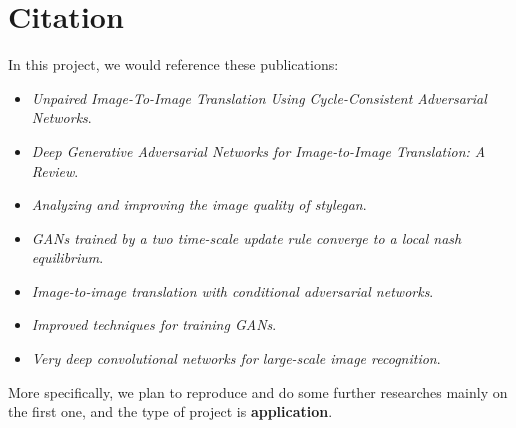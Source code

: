 \section{Citation}

In this project, we would reference these publications:
\begin{itemize}
    \item \textit{Unpaired Image-To-Image Translation Using Cycle-Consistent Adversarial Networks}\cite{zhu_unpaired_2017}.
    \item \textit{Deep Generative Adversarial Networks for Image-to-Image Translation: A Review}\cite{sym12101705}.
    \item \textit{Analyzing and improving the image quality of stylegan}\cite{karras2020analyzing}.
    \item \textit{GANs trained by a two time-scale update rule converge to a local nash equilibrium}\cite{heusel2017gans}.
    \item \textit{Image-to-image translation with conditional adversarial networks}\cite{isola2017image}.
    \item \textit{Improved techniques for training GANs}\cite{salimans2016improved}.
    \item \textit{Very deep convolutional networks for large-scale image recognition}\cite{simonyan2014very}.
\end{itemize}

More specifically, we plan to reproduce and
do some further researches mainly on the first one,
and the type of project is \textbf{application}.
